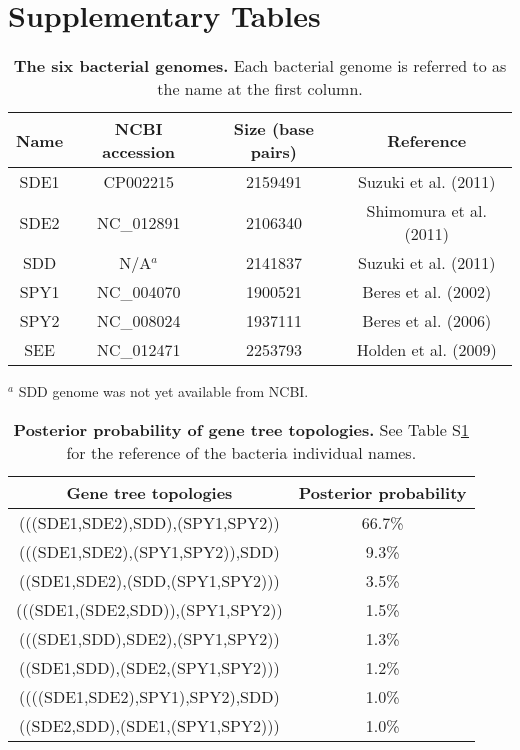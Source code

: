 \documentclass[12pt]{article}
\providecommand{\tabularnewline}{\\}
\begin{document}
\clearpage{}\setcounter{figure}{0}
\setcounter{table}{0}
\renewcommand{\figurename}{Supplementary Figure}
\renewcommand{\tablename}{Supplementary Table}

\section*{Supplementary Tables}

\begin{table}[!ht]
\caption{
{\bf The six bacterial genomes.}
Each bacterial genome is referred to as the name at the first column.}
\noindent \begin{centering}
\begin{tabular}{cccc}
\hline 
Name & NCBI accession & Size (base pairs) & Reference\tabularnewline
\hline
SDE1 & CP002215 & 2159491 & Suzuki et al. (2011)\tabularnewline
SDE2 & NC\_012891 & 2106340 & Shimomura et al. (2011)\tabularnewline
SDD & N/A$^a$ & 2141837 & Suzuki et al. (2011)\tabularnewline
SPY1 & NC\_004070 & 1900521 & Beres et al. (2002)\tabularnewline
SPY2 & NC\_008024 & 1937111 & Beres et al. (2006)\tabularnewline
SEE & NC\_012471 & 2253793 & Holden et al. (2009)\tabularnewline
\hline
\end{tabular}
\par\end{centering}
\begin{flushleft}
$^a$ SDD genome was not yet available from NCBI.
\end{flushleft}
\label{tab:genome}
\end{table}


\begin{table}[!ht]
\caption{
{\bf Posterior probability of gene tree topologies.}
See Table S\ref{tab:genome} for the reference of the bacteria
individual names.}
\noindent \begin{centering}
\begin{tabular}{cc}
\hline 
Gene tree topologies & Posterior probability\tabularnewline
\hline
(((SDE1,SDE2),SDD),(SPY1,SPY2)) & 66.7\%\tabularnewline
(((SDE1,SDE2),(SPY1,SPY2)),SDD) & 9.3\%\tabularnewline
((SDE1,SDE2),(SDD,(SPY1,SPY2))) & 3.5\%\tabularnewline
(((SDE1,(SDE2,SDD)),(SPY1,SPY2)) & 1.5\%\tabularnewline
(((SDE1,SDD),SDE2),(SPY1,SPY2)) & 1.3\%\tabularnewline
((SDE1,SDD),(SDE2,(SPY1,SPY2))) & 1.2\%\tabularnewline
((((SDE1,SDE2),SPY1),SPY2),SDD) & 1.0\%\tabularnewline
((SDE2,SDD),(SDE1,(SPY1,SPY2))) & 1.0\%\tabularnewline
\hline
\end{tabular}
\par\end{centering}
\label{tab:Gene-tree-topologies}
\end{table}
\end{document}
